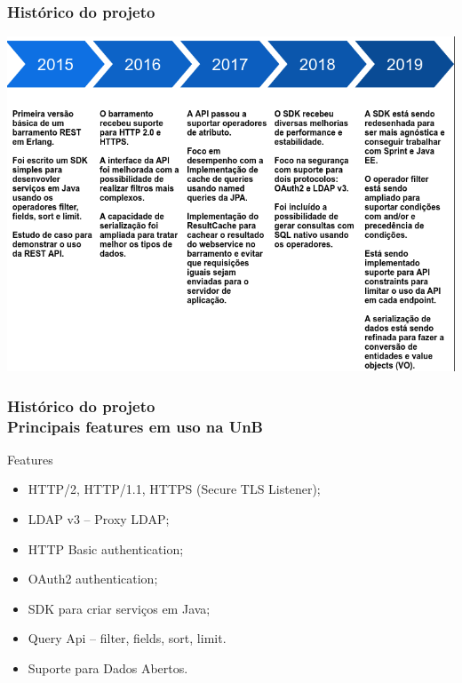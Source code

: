 \documentclass{beamer}
\begin{document}
\begin{frame}

	\frametitle{Histórico do projeto}

	\centering
	\includegraphics[scale=0.30]{img/historico.png}

\end{frame}



\begin{frame}
	\frametitle{Histórico do projeto \\ \small{Principais features em uso na UnB}}

\begin{exampleblock}{Features}
	
	\begin{itemize}
		\item<1->HTTP/2, HTTP/1.1, HTTPS (Secure TLS Listener);
		\item<1->LDAP v3 -- Proxy LDAP;
		\item<1->HTTP Basic authentication;
		\item<1->OAuth2 authentication;
		\item<1->SDK para criar serviços em Java;
		\item<1->Query Api -- filter, fields, sort, limit.
		\item<1->Suporte para Dados Abertos.
	\end{itemize}
	
\end{exampleblock}


\end{frame}
\end{document}
